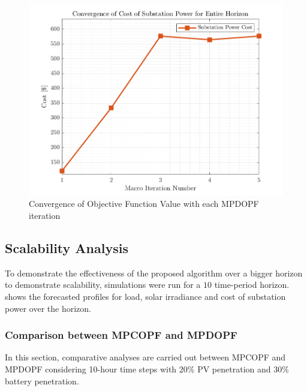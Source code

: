 \documentclass[../../outputs/main.tex]{subfiles}
\begin{document}
\begin{figure}[h!] %
    \centering
    \includegraphics[height=0.25\textheight]{../figures/T5-pv20-batt30-genCost/dopf/outputCurves/ObjectiveConvergenceCurves_Horizon_5.png}
    \caption{Convergence of Objective Function Value with each MPDOPF iteration}
    \label{fig:outputConvergence-5-pv20-batt30-genCost}
\end{figure}

\subsection{Scalability Analysis} \label{subsec:scalabilityAnalysis}

To demonstrate the effectiveness of the proposed algorithm over a bigger horizon to demonstrate scalability, simulations were run for a $10$ time-period horizon.  shows the forecasted profiles for load, solar irradiance and cost of substation power over the horizon. 

\subsubsection{Comparison between MPCOPF and MPDOPF}
In this section, comparative analyses are carried out between MPCOPF and MPDOPF considering 10-hour time steps with $20\%$ PV penetration and $30\%$ battery penetration.
\end{document}
